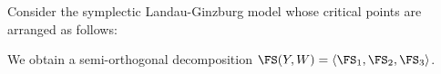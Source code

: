 

\label{exm:HMSforP2}
Consider the symplectic Landau-Ginzburg model whose critical points are arranged as follows:

 We obtain a semi-orthogonal decomposition $\FS(Y, W) = \langle \FS_1, \FS_2, \FS_3 \rangle$.

